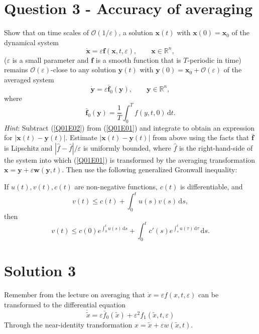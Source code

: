 \documentclass[twoside,10pt,a4paper]{article}
\begin{document}
\section*{Question 3 - Accuracy of averaging}
Show that on time scales of $\mathcal{O}(1/\varepsilon)$, a solution $\mathbf{x}(t)$ with $\mathbf{x}(0) = \mathbf{x}_0$ of the dynamical system
\begin{equation}\label{Q01E01}
	\dot{\mathbf{x}} = \varepsilon \mathbf{f}(\mathbf{x},t, \varepsilon), \qquad \mathbf{x} \in \mathbb{R}^n,
\end{equation}
($\varepsilon$ is a small parameter and $\mathbf{f}$ is a smooth function that is $T$-periodic in time) remains $\mathcal{O}(\varepsilon)$-close to any solution $\mathbf{y}(t)$ with $\mathbf{y}(0) = \mathbf{x}_0 + \mathcal{O}(\varepsilon)$ of the averaged system
\begin{equation}\label{Q01E02}
	\dot{\mathbf{y}} = \varepsilon \bar{\mathbf{f}}_0 (\mathbf{y}), \qquad \mathbf{y} \in \mathbb{R}^n,
\end{equation}
where
\begin{equation*}
	\bar{\mathbf{f}}_0 (\mathbf{y}) = \frac{1}{T} \int_0^T f(y,t,0) \, \text{d}t.
\end{equation*}
\textit{Hint}: Subtract (\ref{Q01E02}) from (\ref{Q01E01}) and integrate to obtain an expression for $|\mathbf{x}(t) - \mathbf{y}(t)|$. Estimate $|\mathbf{x}(t) - \mathbf{y}(t)|$ from above using the facts that $\bar{\mathbf{f}}$ is Lipschitz and $|\hat{f} - \bar{f}|/\varepsilon$ is uniformly bounded, where $\hat{f}$ is the right-hand-side of the system into which (\ref{Q01E01}) is transformed by the averaging transformation $\mathbf{x} = \mathbf{y} + \varepsilon \mathbf{w}(\mathbf{y},t)$. Then use the following generalized Gronwall inequality:

If $u(t), v(t), c(t)$ are non-negative functions, $c(t)$ is differentiable, and
\begin{equation*}
	v(t) \leq c(t) + \int_0^t u(s)v(s) \, \text{d}s,
\end{equation*}
then
\begin{equation*}
	v(t) \leq c(0) e^{\int_0^t u(s)\, \text{d}s} + \int_0^t c'(s)e^{\int_s^t u(\tau)\,\text{d}\tau}\, \text{d}s.
\end{equation*}

\section*{Solution 3}
Remember from the lecture on averaging that $\dot{x} = \varepsilon f(x,t, \varepsilon)$ can be transformed to the differential equation
\begin{equation}\label{S05E021}
	\dot{\tilde{x}} = \varepsilon \bar{f}_0(\tilde{x}) + \varepsilon^2f_1(\tilde{x},t,\varepsilon)
\end{equation}
Through the near-identity transformation $x = \tilde{x} + \varepsilon w(\tilde{x},t)$.
\end{document}
